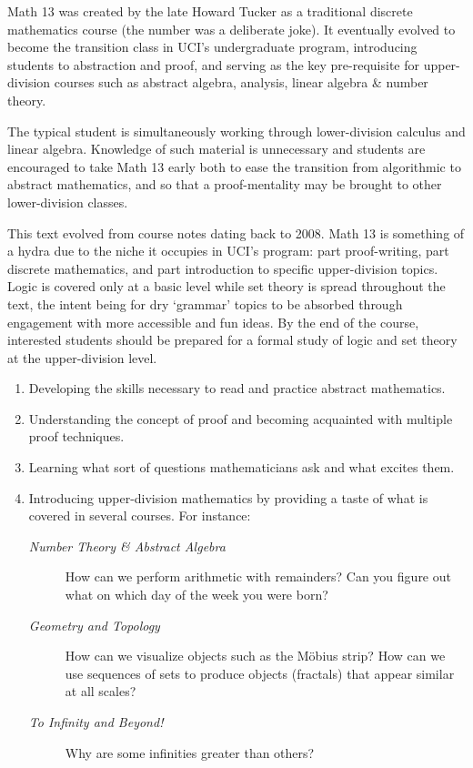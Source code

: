 Math 13 was created by the late Howard Tucker as a traditional discrete mathematics course (the number was a deliberate joke). It eventually evolved to become the transition class in UCI's undergraduate program, introducing students to abstraction and proof, and serving as the key pre-requisite for upper-division courses such as abstract algebra, analysis, linear algebra \& number theory.\smallbreak

The typical student is simultaneously working through lower-division calculus and linear algebra. Knowledge of such material is unnecessary and students are encouraged to take Math 13 early both to ease the transition from algorithmic to abstract mathematics, and so that a proof-mentality may be brought to other lower-division classes.\smallbreak

This text evolved from course notes dating back to 2008. Math 13 is something of a hydra due to the niche it occupies in UCI's program: part proof-writing, part discrete mathematics, and part introduction to specific upper-division topics. Logic is covered only at a basic level while set theory is spread throughout the text, the intent being for dry `grammar' topics to be absorbed through engagement with more accessible and fun ideas. By the end of the course, interested students should be prepared for a formal study of logic and set theory at the upper-division level.



\begin{enumerate}
	\item Developing the skills necessary to read and practice abstract mathematics.
	\item Understanding the concept of proof and becoming acquainted with multiple proof techniques.
	\item Learning what sort of questions mathematicians ask and what excites them.
	\item Introducing upper-division mathematics by providing a taste of what is covered in several courses. For instance:
	\begin{description}
		\item[\normalfont\emph{Number Theory \& Abstract Algebra}] How can we perform arithmetic with remainders? Can you figure out what on which day of the week you were born? 
		\item[\normalfont\emph{Geometry and Topology}] How can we visualize objects such as the Möbius strip? How can we use sequences of sets to produce objects (fractals) that appear similar at all scales?
		\item[\normalfont\emph{To Infinity and Beyond!}] Why are some infinities greater than others?
	\end{description}
\end{enumerate}


